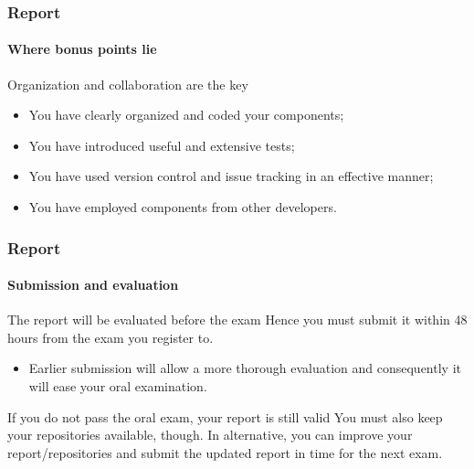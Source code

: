 \begin{frame}
\frametitle{Report}
\framesubtitle{Where bonus points lie}

\begin{block}{Organization and collaboration are the key}
\begin{itemize}
\item You have clearly organized and coded your components;
\item You have introduced useful and extensive tests;
\item You have used version control and issue tracking in an effective manner;
\item You have employed components from other developers.
\end{itemize}
\end{block}
\end{frame}

\begin{frame}
\frametitle{Report}
\framesubtitle{Submission and evaluation}

\begin{block}{The report will be evaluated before the exam}
Hence you must submit it within 48 hours from the exam you register to.
\begin{itemize}
\item Earlier submission will allow a more thorough evaluation and consequently it will ease your oral examination.
\end{itemize}
\end{block}
\pause
\begin{block}{If you do not pass the oral exam, your report is still valid}
You must also keep your repositories available, though. 
In alternative, you can improve your report/repositories and submit the updated report in time for the next exam.
\end{block}
\end{frame}
